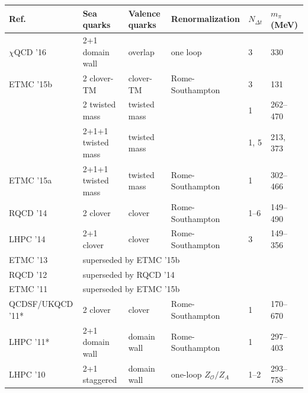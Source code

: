 \begin{table}[!t]
\renewcommand{\arraystretch}{1.2} 
\centering
\footnotesize
\begin{threeparttable}
\begin{tabular}{llllll}
\toprule
Ref. & Sea quarks & Valence quarks & Renormalization 
& $N_{\Delta t}$ & $m_\pi$ (MeV)\\
\midrule

  $\chi$QCD '16 \cite{Yang:2015zja} &
  2+1 domain wall & overlap & one loop & 3 & 330 \\

  ETMC '15b \cite{Abdel-Rehim:2015owa} &
    2 clover-TM & clover-TM & Rome-Southampton & 3 & 131 \\
  & 2 twisted mass & twisted mass & & 1 & 262--470\\
  & 2+1+1 twisted mass & twisted mass & & 1, 5 & 213, 373\\

  ETMC '15a \cite{Alexandrou:2015qia} &
  2+1+1 twisted mass & twisted mass & Rome-Southampton & 1 & 302--466 \\

  RQCD '14 \cite{Bali:2014gha} &
  2 clover & clover & Rome-Southampton & 1--6 & 149--490 \\

  LHPC '14 \cite{Green:2012ud} &
  2+1 clover & clover & Rome-Southampton & 3 & 149--356\\

  ETMC '13 \cite{Alexandrou:2013joa} &
  \multicolumn{5}{l}{superseded by ETMC '15b} \\

  RQCD '12 \cite{Bali:2012av} &
  \multicolumn{5}{l}{superseded by RQCD '14} \\

  ETMC '11 \cite{Alexandrou:2011nr} &
  \multicolumn{5}{l}{superseded by ETMC '15b} \\

  QCDSF/UKQCD '11* \cite{Pleiter:2011gw} &
  2 clover & clover & Rome-Southampton & 1 & 170--670 \\

  LHPC '11* \cite{Syritsyn:2011vk} &
  2+1 domain wall & domain wall & Rome-Southampton & 1 & 297--403 \\

  LHPC '10 \cite{Bratt:2010jn} &
  2+1 staggered & domain wall & one-loop $Z_\mathcal{O}/Z_A$ & 1--2 & 293--758 \\


\end{tabular}
\end{threeparttable}
\end{table}
